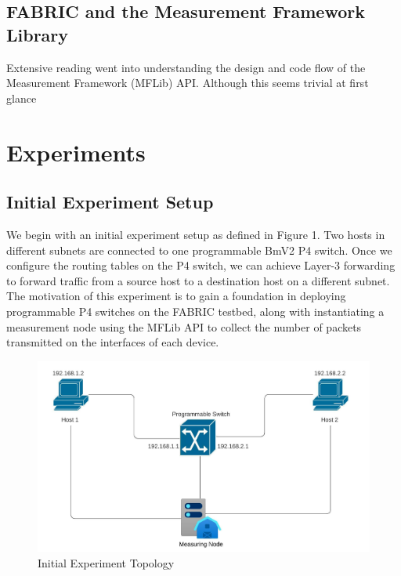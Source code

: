 \documentclass[conference]{IEEEtran}
\begin{document}
    \subsection{FABRIC and the Measurement Framework Library}
    Extensive reading went into understanding the design and code flow of the Measurement Framework (MFLib) API. Although this seems trivial at first glance

    \section{Experiments}
    \subsection{Initial Experiment Setup}
    We begin with an initial experiment setup as defined in Figure 1. Two hosts in different subnets are connected to one programmable BmV2 P4 switch. Once we configure the routing tables on the P4 switch, we can achieve Layer-3 forwarding to forward traffic from a source host to a destination host on a different subnet. The motivation of this experiment is to gain a foundation in deploying programmable P4 switches on the FABRIC testbed, along with instantiating a measurement node using the MFLib API to collect the number of packets transmitted on the interfaces of each device.

   \begin{figure}[b]
        \includegraphics[scale=0.4]{Initial_Switch_Topology.jpeg}
        \centering
        \caption{Initial Experiment Topology}
    \end{figure}
\end{document}
